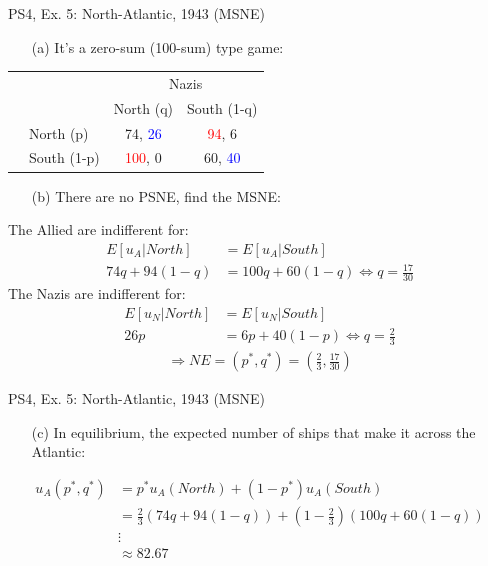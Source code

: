 \begin{frame}{PS4, Ex. 5: North-Atlantic, 1943 (MSNE)}
    \begin{itemize}
      \item[(a)] It's a zero-sum (100-sum) type game:
    \end{itemize}
    \vspace{-15pt}
    \hspace{-15pt}\begin{table}
      \begin{tabular}{cl|c|c|}
          & \multicolumn{1}{c}{} & \multicolumn{2}{c}{\color{blue}Nazis}\\
          \parbox[t]{1mm}{}
          &  &  &  \\
          & North (p)    & 74, \textcolor{blue}{26} & \textcolor{red}{94}, 6 \\
          & South (1-p)  & \textcolor{red}{100}, 0 & 60, \textcolor{blue}{40} \\
      \end{tabular}
    \end{table}
    \begin{itemize}
      \item[(b)] There are no PSNE, find the MSNE:
    \end{itemize}
    The Allied are indifferent for:
    \begin{align*}
      E[u_A|North]&=E[u_A|South]\\
      74q + 94(1-q) &= 100q + 60(1-q) \Leftrightarrow q = \frac{17}{30}
    \end{align*}
    The Nazis are indifferent for:
    \begin{align*}
      E[u_N|North]&=E[u_N|South]\\
      26p &= 6p + 40(1-p) \Leftrightarrow q = \frac{2}{3}
    \end{align*}
    \begin{align*}
      \Rightarrow NE=(p^{*},q^{*})=\left(\frac{2}{3},\frac{17}{30}\right)
    \end{align*}
\end{frame}
\begin{frame}{PS4, Ex. 5: North-Atlantic, 1943 (MSNE)}
  \begin{itemize}
    \item[(c)] In equilibrium, the expected number of ships that make it across the Atlantic:
  \end{itemize}
  \begin{align*}
     u_A(p^{*},q^{*}) &= p^{*}u_A(North)+(1-p^{*})u_A(South)\\
     &= \frac{2}{3}(74q + 94(1-q)) + \left(1-\frac{2}{3}\right)(100q + 60(1-q)) \\
     & \vdots \\
     &\approx 82.67
  \end{align*}
\end{frame}


